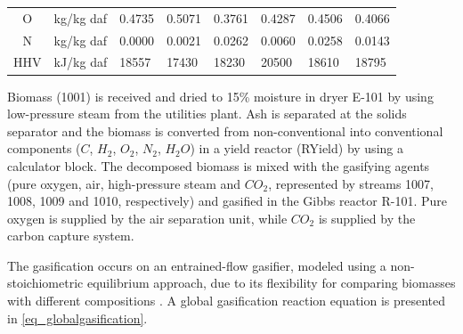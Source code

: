 \documentclass[a4paper, titlepage]{article}
\begin{document}
\begin{table}
\begin{tabular}{||c | c | C{2.0cm} | C{2.0cm} | C{2.0cm} | C{2.0cm} | C{2.0cm} | C{2.0cm} ||}
        O        & kg/kg daf \footnotemark[2] & 0.4735                                                            & 0.5071                                                          & 0.3761                                               & 0.4287                                                     & 0.4506                                    & 0.4066                                                         \\
        N        & kg/kg daf \footnotemark[2] & 0.0000                                                            & 0.0021                                                          & 0.0262                                               & 0.0060                                                     & 0.0258                                    & 0.0143                                                         \\
        \hline
        HHV      & kJ/kg daf \footnotemark[2] & 18557                                                             & 17430                                                           & 18230                                                & 20500                                                      & 18610                                     & 18795                                                          \\
        \hline
    \end{tabular}

\end{table}
Biomass (1001) is received and dried to 15\% moisture in dryer E-101 by using low-pressure steam from the utilities
plant.
Ash is separated at the solids separator and the biomass is converted from non-conventional into conventional
components ($C$, $H_2$, $O_2$, $N_2$, $H_2O$) in a yield reactor (RYield) by using a calculator block.
The decomposed biomass is mixed with the gasifying agents (pure oxygen, air, high-pressure steam and $CO_2$,
represented by streams 1007, 1008, 1009 and 1010, respectively) and gasified in the Gibbs reactor R-101.
Pure oxygen is supplied by the air separation unit, while $CO_2$ is supplied by the carbon capture system.

The gasification occurs on an entrained-flow gasifier, modeled using a non-stoichiometric equilibrium approach,
due to its flexibility for comparing biomasses with different compositions
\cite{gambarottaNonstoichiometricEquilibriumModel2018}. A global gasification reaction equation is presented in
\autoref{eq_globalgasification}.
\end{document}
